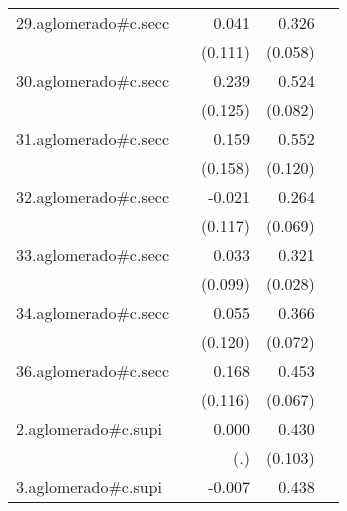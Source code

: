 {\begin{longtable}{l*{4}{D{.}{.}{-1}}}
\addlinespace
29.aglomerado#c.secc&                     &       0.041         &       0.326\sym{***}&                     \\
            &                     &     (0.111)         &     (0.058)         &                     \\
\addlinespace
30.aglomerado#c.secc&                     &       0.239         &       0.524\sym{***}&                     \\
            &                     &     (0.125)         &     (0.082)         &                     \\
\addlinespace
31.aglomerado#c.secc&                     &       0.159         &       0.552\sym{***}&                     \\
            &                     &     (0.158)         &     (0.120)         &                     \\
\addlinespace
32.aglomerado#c.secc&                     &      -0.021         &       0.264\sym{***}&                     \\
            &                     &     (0.117)         &     (0.069)         &                     \\
\addlinespace
33.aglomerado#c.secc&                     &       0.033         &       0.321\sym{***}&                     \\
            &                     &     (0.099)         &     (0.028)         &                     \\
\addlinespace
34.aglomerado#c.secc&                     &       0.055         &       0.366\sym{***}&                     \\
            &                     &     (0.120)         &     (0.072)         &                     \\
\addlinespace
36.aglomerado#c.secc&                     &       0.168         &       0.453\sym{***}&                     \\
            &                     &     (0.116)         &     (0.067)         &                     \\
\addlinespace
2.aglomerado#c.supi&                     &       0.000         &       0.430\sym{***}&                     \\
            &                     &         (.)         &     (0.103)         &                     \\
\addlinespace
3.aglomerado#c.supi&                     &      -0.007         &       0.438\sym{***}&                     \\

\end{longtable}}

